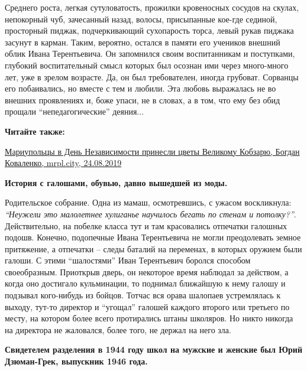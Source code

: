 Среднего роста, легкая сутуловатость, прожилки кровеносных сосудов на скулах,
непокорный чуб, зачесанный назад, волосы, присыпанные кое-где сединой,
просторный пиджак, подчеркивающий сухопарость торса, левый рукав пиджака
засунут в карман. Таким, вероятно, остался в памяти его учеников внешний облик
Ивана Терентьевича. Он запомнился своим воспитанникам и поступками, глубокий
воспитательный смысл которых был осознан ими через много-много лет, уже в
зрелом возрасте. Да, он был требователен, иногда грубоват. Сорванцы его
побаивались, но вместе с тем и любили. Эта любовь выражалась не во внешних
проявлениях и, боже упаси, не в словах, а в том, что ему без обид прощали
\enquote{непедагогические} деяния...

\textbf{Читайте также:} 

\href{https://mrpl.city/news/view/mariupoltsy-v-den-nezavisimosti-prinesli-tsvety-velikomu-kobzaryu-fotofakt-1}{%
Мариупольцы в День Независимости принесли цветы Великому Кобзарю, Богдан Коваленко, mrpl.city, 24.08.2019}


\textbf{История с галошами, обувью, давно вышедшей из моды.}

Родительское собрание. Одна из мамаш, осмотревшись, с ужасом воскликнула:
\emph{\enquote{Неужели это малолетнее хулиганье научилось бегать по стенам и потолку?}}.
Действительно, на побелке класса тут и там красовались отпечатки галошных
подошв. Конечно, подопечные Ивана Терентьевича не могли преодолевать земное
притяжение, а отпечатки – следы баталий на переменах, в которых оружием были
галоши. С этими \enquote{шалостями} Иван Терентьевич боролся способом своеобразным.
Приоткрыв дверь, он некоторое время наблюдал за действом, а когда оно достигало
кульминации, то поднимал ближайшую к нему галошу и подзывал кого-нибудь из
бойцов. Тотчас вся орава шалопаев устремлялась к выходу, тут-то директор и
\enquote{угощал} галошей каждого второго или третьего по месту, на котором более всего
протирались штаны школяров. Но никто никогда на директора не жаловался, более
того, не держал на него зла.

\textbf{Свидетелем разделения в 1944 году школ на мужские и женские был Юрий Дзюман-Грек, выпускник 1946 года.}

